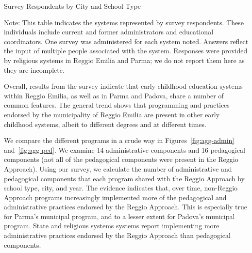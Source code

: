 \begin{table}[H]
\centering
\caption{Survey Respondents by City and School Type}\label{tab:respondents}
\begin{threeparttable}
	
\begin{tablenotes}
\footnotesize Note: This table indicates the systems represented by survey respondents. These individuals include current and former administrators and educational coordinators. One survey was administered for each system noted. Answers reflect the input of multiple people associated with the system. Responses were provided by religious systems in Reggio Emilia and Parma; we do not report them here as they are incomplete. \end{tablenotes}
\end{threeparttable}
\end{table}

Overall, results from the survey indicate that early childhood education systems within Reggio Emilia, as well as in Parma and Padova, share a number of common features. The general trend shows that programming and practices endorsed by the municipality of Reggio Emilia are present in other early childhood systems, albeit to different degrees and at different times. 

We compare the different programs in a crude way in Figures~\ref{fig:agg-admin} and~\ref{fig:agg-ped}. We examine 14 administrative components and 16 pedagogical components (not all of the pedagogical components were present in the Reggio Approach). Using our survey, we calculate the number of administrative and pedagogical components that each program shared with the Reggio Approach by school type, city, and year. The evidence indicates that, over time, non-Reggio Approach programs increasingly implemented more of the pedagogical and administrative practices endorsed by the Reggio Approach. This is especially true for Parma's municipal program, and to a lesser extent for Padova's municipal program. State and religious systems systems report implementing more administrative practices endorsed by the Reggio Approach than pedagogical components. 

